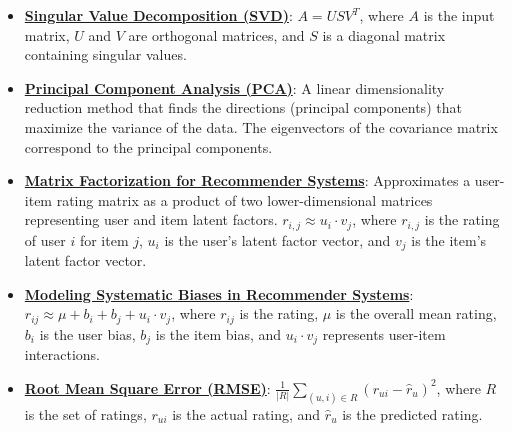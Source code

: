 \documentclass{article}%
\begin{document}
\begin{itemize}[leftmargin=*]%
\item \href{https://purdue.brightspace.com/d2l/common/assets/pdfjs-d2l-dist/1.0.14-legacy/web/viewer.html?file=\%2Fcontent\%2Fenforced\%2F1095467-wl.202510.CS.24300.001\%2F11L2-svd-pca-recommender.pdf\%3Fou\%3D1095467\&lang=en-us\&container=d2l-fileviewer-rendered-pdf\&fullscreen=d2l-fileviewer-rendered-pdf-dialog\&height=667#page=10}{\textbf{Singular Value Decomposition (SVD)}}: $A = USV^T$, where $A$ is the input matrix, $U$ and $V$ are orthogonal matrices, and $S$ is a diagonal matrix containing singular values.%
\item \href{https://purdue.brightspace.com/d2l/common/assets/pdfjs-d2l-dist/1.0.14-legacy/web/viewer.html?file=\%2Fcontent\%2Fenforced\%2F1095467-wl.202510.CS.24300.001\%2F11L2-svd-pca-recommender.pdf\%3Fou\%3D1095467\&lang=en-us\&container=d2l-fileviewer-rendered-pdf\&fullscreen=d2l-fileviewer-rendered-pdf-dialog\&height=667#page=17}{\textbf{Principal Component Analysis (PCA)}}: A linear dimensionality reduction method that finds the directions (principal components) that maximize the variance of the data. The eigenvectors of the covariance matrix correspond to the principal components.%
\item \href{https://purdue.brightspace.com/d2l/common/assets/pdfjs-d2l-dist/1.0.14-legacy/web/viewer.html?file=\%2Fcontent\%2Fenforced\%2F1095467-wl.202510.CS.24300.001\%2F11L2-svd-pca-recommender.pdf\%3Fou\%3D1095467\&lang=en-us\&container=d2l-fileviewer-rendered-pdf\&fullscreen=d2l-fileviewer-rendered-pdf-dialog\&height=667#page=36}{\textbf{Matrix Factorization for Recommender Systems}}: Approximates a user-item rating matrix as a product of two lower-dimensional matrices representing user and item latent factors. $r_{i,j} \approx u_i \cdot v_j$, where $r_{i,j}$ is the rating of user $i$ for item $j$, $u_i$ is the user's latent factor vector, and $v_j$ is the item's latent factor vector.%
\item \href{https://purdue.brightspace.com/d2l/common/assets/pdfjs-d2l-dist/1.0.14-legacy/web/viewer.html?file=\%2Fcontent\%2Fenforced\%2F1095467-wl.202510.CS.24300.001\%2F11L2-svd-pca-recommender.pdf\%3Fou\%3D1095467\&lang=en-us\&container=d2l-fileviewer-rendered-pdf\&fullscreen=d2l-fileviewer-rendered-pdf-dialog\&height=667#page=44}{\textbf{Modeling Systematic Biases in Recommender Systems}}: $r_{ij} \approx \mu + b_i + b_j + u_i \cdot v_j$, where $r_{ij}$ is the rating, $\mu$ is the overall mean rating, $b_i$ is the user bias, $b_j$ is the item bias, and $u_i \cdot v_j$ represents user-item interactions.%
\item \href{https://purdue.brightspace.com/d2l/common/assets/pdfjs-d2l-dist/1.0.14-legacy/web/viewer.html?file=\%2Fcontent\%2Fenforced\%2F1095467-wl.202510.CS.24300.001\%2F11L2-svd-pca-recommender.pdf\%3Fou\%3D1095467\&lang=en-us\&container=d2l-fileviewer-rendered-pdf\&fullscreen=d2l-fileviewer-rendered-pdf-dialog\&height=667#page=49}{\textbf{Root Mean Square Error (RMSE)}}: $\frac{1}{|R|} \sum_{(u,i) \in R} (r_{ui} - \hat{r}_u)^2$, where $R$ is the set of ratings, $r_{ui}$ is the actual rating, and $\hat{r}_u$ is the predicted rating.%
\end{itemize}%
\end{document}
